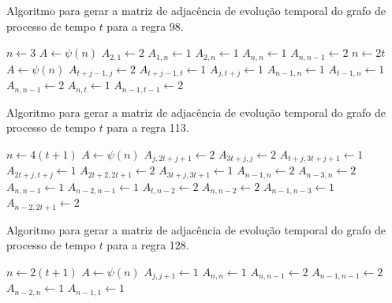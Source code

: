 \documentclass[12pt,a4paper]{article}
\begin{document}
\begin{algorithm}[H]
\caption{Algoritmo para gerar a matriz de adjacência de evolução temporal do
grafo de processo de tempo $t$ para a regra 98.}
\label{alg:r98}
\begin{algorithmic}
    \STATE $n \leftarrow 3$
    \STATE $A \leftarrow \psi(n)$
    \STATE $A_{2,1} \leftarrow 2$
    \STATE $A_{1,n} \leftarrow 1$
    \STATE $A_{2,n} \leftarrow 1$
    \STATE $A_{n,n} \leftarrow 1$
    \STATE $A_{n,n-1} \leftarrow 2$
\ELSE
    \STATE $n \leftarrow 2t$
    \STATE $A \leftarrow \psi(n)$
        \STATE $A_{t+j-1,j} \leftarrow 2$
        \STATE $A_{t+j-1,t} \leftarrow 1$
    \ENDFOR
            \STATE $A_{j,t+j} \leftarrow 1$
        \ENDFOR
    \ENDIF
    \STATE $A_{n-1,n} \leftarrow 1$
    \STATE $A_{t-1,n} \leftarrow 1$
    \STATE $A_{n,n-1} \leftarrow 2$
    \STATE $A_{n,t} \leftarrow 1$
    \STATE $A_{n-1,t-1} \leftarrow 2$
\ENDIF
\end{algorithmic}
\end{algorithm}

\begin{algorithm}[H]
\caption{Algoritmo para gerar a matriz de adjacência de evolução temporal do
grafo de processo de tempo $t$ para a regra 113.}
\label{alg:r113}
\begin{algorithmic}
\STATE $n \leftarrow 4(t+1)$
\STATE $A \leftarrow \psi(n)$
        \STATE $A_{j,2t+j+1} \leftarrow 2$
    \ENDFOR
\ENDIF
{}
    \STATE $A_{3t+j,j} \leftarrow 2$
    \STATE $A_{t+j,3t+j+1} \leftarrow 1$
    \STATE $A_{2t+j,t+j} \leftarrow 1$
    \STATE $A_{2t+2,2t+1} \leftarrow 2$
\ENDFOR
{}
    \STATE $A_{3t+j,3t+1} \leftarrow 1$
\ENDFOR
\STATE $A_{n-1,n} \leftarrow 2$
\STATE $A_{n-3,n} \leftarrow 2$
\STATE $A_{n,n-1} \leftarrow 1$
\STATE $A_{n-2,n-1} \leftarrow 1$
\STATE $A_{t,n-2} \leftarrow 2$
\STATE $A_{n,n-2} \leftarrow 2$
\STATE $A_{n-1,n-3} \leftarrow 1$
\STATE $A_{n-2,2t+1} \leftarrow 2$
\end{algorithmic}
\end{algorithm}

\begin{algorithm}[H]
\caption{Algoritmo para gerar a matriz de adjacência de evolução temporal do
grafo de processo de tempo $t$ para a regra 128.}
\label{alg:r128}
\begin{algorithmic}
\STATE $n \leftarrow 2(t+1)$
\STATE $A \leftarrow \psi(n)$
    \STATE $A_{j,j+1} \leftarrow 1$
\ENDFOR
\STATE $A_{n,n} \leftarrow 1$
\STATE $A_{n,n-1} \leftarrow 2$
\STATE $A_{n-1,n-1} \leftarrow 2$
\STATE $A_{n-2,n} \leftarrow 1$
\STATE $A_{n-1,1} \leftarrow 1$
\end{algorithmic}
\end{algorithm}
\end{document}
